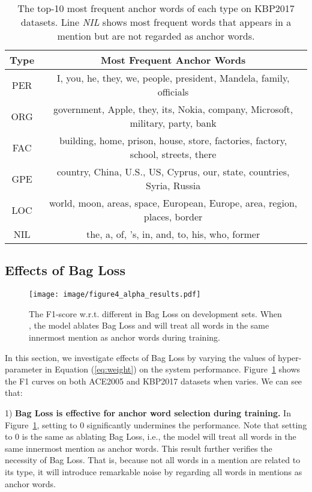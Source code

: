 \documentclass[11pt,a4paper]{article}
\begin{document}
\begin{table*}
\begin{center}
\begin{tabular}{|c|c|}
\hline
\textbf{Type} & \textbf{Most Frequent Anchor Words }\\ \hline
PER & I, you, he, they, we, people, president, Mandela, family, officials \\ \hline
ORG & government, Apple, they, its, Nokia, company, Microsoft, military, party, bank \\ \hline
FAC & building, home, prison, house, store, factories, factory, school, streets, there \\ \hline
GPE & country, China, U.S., US, Cyprus, our, state, countries, Syria, Russia \\ \hline
LOC & world, moon, areas, space, European, Europe, area, region, places, border \\ \hline \hline
NIL & the, a, of, 's, in, and, to, his, who, former \\ \hline
\end{tabular}
\end{center}
\caption{The top-10 most frequent anchor words of each type on KBP2017 datasets. Line \emph{NIL} shows most frequent words that appears in a mention but are not regarded as anchor words.}
\label{tab:frequent_head_words}
\end{table*}

\subsection{Effects of Bag Loss}
\label{sec:ana_bagloss}

\begin{figure}
  \centering
  \setlength{\belowcaptionskip}{-0.5cm}
  \texttt{[image: image/figure4\_alpha\_results.pdf]}\\
  \caption{The F1-score w.r.t. different  in Bag Loss on development sets. When , the model ablates Bag Loss and will treat all words in the same innermost mention as anchor words during training.}
  \label{fig:alpha}
\end{figure}
In this section, we investigate effects of Bag Loss by varying the values of hyper-parameter  in Equation (\ref{eq:weight}) on the system performance. Figure~\ref{fig:alpha} shows the F1 curves on both ACE2005 and KBP2017 datasets when  varies. We can see that:

1) \textbf{Bag Loss is effective for anchor word selection during training.} In Figure~\ref{fig:alpha}, setting  to 0 significantly undermines the performance. Note that setting  to 0 is the same as ablating Bag Loss, i.e., the model will treat all words in the same innermost mention as anchor words. This result further verifies the necessity of Bag Loss. That is, because not all words in a mention are related to its type, it will introduce remarkable noise by regarding all words in mentions as anchor words.
\end{document}
